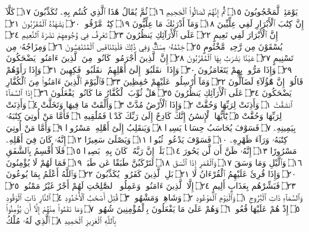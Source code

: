 يَوْمَئِذࣲ لَّمَحْجُوبُونَ ۝١٥ ثُمَّ إِنَّهُمْ لَصَالُوا۟ ٱلْجَحِيمِ ۝١٦ ثُمَّ يُقَالُ هَٰذَا
ٱلَّذِي كُنتُم بِهِۦ تُكَذِّبُونَ ۝١٧ كَلَّآ إِنَّ كِتَٰبَ ٱلْأَبْرَارِ لَفِي عِلِّيِّينَ ۝١٨
وَمَآ أَدْرَىٰكَ مَا عِلِّيُّونَ ۝١٩ كِتَٰبࣱ مَّرْقُومࣱ ۝٢٠ يَشْهَدُهُ ٱلْمُقَرَّبُونَ ۝٢١
إِنَّ ٱلْأَبْرَارَ لَفِي نَعِيمٍ ۝٢٢ عَلَى ٱلْأَرَآئِكِ يَنظُرُونَ ۝٢٣ تَعْرِفُ فِي
وُجُوهِهِمْ نَضْرَةَ ٱلنَّعِيمِ ۝٢٤ يُسْقَوْنَ مِن رَّحِيقࣲ مَّخْتُومٍ ۝٢٥ خِتَٰمُهُۥ
مِسْكࣱۚ وَفِي ذَٰلِكَ فَلْيَتَنَافَسِ ٱلْمُتَنَٰفِسُونَ ۝٢٦ وَمِزَاجُهُۥ مِن
تَسْنِيمٍ ۝٢٧ عَيْنࣰا يَشْرَبُ بِهَا ٱلْمُقَرَّبُونَ ۝٢٨ إِنَّ ٱلَّذِينَ أَجْرَمُوا۟ كَانُوا۟
مِنَ ٱلَّذِينَ ءَامَنُوا۟ يَضْحَكُونَ ۝٢٩ وَإِذَا مَرُّوا۟ بِهِمْ يَتَغَامَزُونَ ۝٣٠
وَإِذَا ٱنقَلَبُوٓا۟ إِلَىٰٓ أَهْلِهِمُ ٱنقَلَبُوا۟ فَكِهِينَ ۝٣١ وَإِذَا رَأَوْهُمْ قَالُوٓا۟
إِنَّ هَٰٓؤُلَآءِ لَضَآلُّونَ ۝٣٢ وَمَآ أُرْسِلُوا۟ عَلَيْهِمْ حَٰفِظِينَ ۝٣٣
فَٱلْيَوْمَ ٱلَّذِينَ ءَامَنُوا۟ مِنَ ٱلْكُفَّارِ يَضْحَكُونَ ۝٣٤ عَلَى
ٱلْأَرَآئِكِ يَنظُرُونَ ۝٣٥ هَلْ ثُوِّبَ ٱلْكُفَّارُ مَا كَانُوا۟ يَفْعَلُونَ ۝٣٦
إِذَا ٱلسَّمَآءُ ٱنشَقَّتْ ۝١ وَأَذِنَتْ لِرَبِّهَا وَحُقَّتْ ۝٢ وَإِذَا ٱلْأَرْضُ مُدَّتْ ۝٣
وَأَلْقَتْ مَا فِيهَا وَتَخَلَّتْ ۝٤ وَأَذِنَتْ لِرَبِّهَا وَحُقَّتْ ۝٥ يَٰٓأَيُّهَا
ٱلْإِنسَٰنُ إِنَّكَ كَادِحٌ إِلَىٰ رَبِّكَ كَدْحࣰا فَمُلَٰقِيهِ ۝٦ فَأَمَّا مَنْ أُوتِيَ
كِتَٰبَهُۥ بِيَمِينِهِۦ ۝٧ فَسَوْفَ يُحَاسَبُ حِسَابࣰا يَسِيرࣰا ۝٨ وَيَنقَلِبُ
إِلَىٰٓ أَهْلِهِۦ مَسْرُورࣰا ۝٩ وَأَمَّا مَنْ أُوتِيَ كِتَٰبَهُۥ وَرَآءَ ظَهْرِهِۦ ۝١٠ فَسَوْفَ
يَدْعُوا۟ ثُبُورࣰا ۝١١ وَيَصْلَىٰ سَعِيرًا ۝١٢ إِنَّهُۥ كَانَ فِيٓ أَهْلِهِۦ مَسْرُورًا ۝١٣
إِنَّهُۥ ظَنَّ أَن لَّن يَحُورَ ۝١٤ بَلَىٰٓۚ إِنَّ رَبَّهُۥ كَانَ بِهِۦ بَصِيرࣰا ۝١٥ فَلَآ أُقْسِمُ
بِٱلشَّفَقِ ۝١٦ وَٱلَّيْلِ وَمَا وَسَقَ ۝١٧ وَٱلْقَمَرِ إِذَا ٱتَّسَقَ ۝١٨
لَتَرْكَبُنَّ طَبَقًا عَن طَبَقࣲ ۝١٩ فَمَا لَهُمْ لَا يُؤْمِنُونَ ۝٢٠ وَإِذَا قُرِئَ
عَلَيْهِمُ ٱلْقُرْءَانُ لَا  ۝٢١ بَلِ ٱلَّذِينَ كَفَرُوا۟ يُكَذِّبُونَ ۝٢٢
وَٱللَّهُ أَعْلَمُ بِمَا يُوعُونَ ۝٢٣ فَبَشِّرْهُم بِعَذَابٍ أَلِيمٍ ۝٢٤
إِلَّا ٱلَّذِينَ ءَامَنُوا۟ وَعَمِلُوا۟ ٱلصَّٰلِحَٰتِ لَهُمْ أَجْرٌ غَيْرُ مَمْنُونِۭ ۝٢٥
وَٱلسَّمَآءِ ذَاتِ ٱلْبُرُوجِ ۝١ وَٱلْيَوْمِ ٱلْمَوْعُودِ ۝٢ وَشَاهِدࣲ وَمَشْهُودࣲ ۝٣
قُتِلَ أَصْحَٰبُ ٱلْأُخْدُودِ ۝٤ ٱلنَّارِ ذَاتِ ٱلْوَقُودِ ۝٥ إِذْ هُمْ عَلَيْهَا
قُعُودࣱ ۝٦ وَهُمْ عَلَىٰ مَا يَفْعَلُونَ بِٱلْمُؤْمِنِينَ شُهُودࣱ ۝٧ وَمَا نَقَمُوا۟
مِنْهُمْ إِلَّآ أَن يُؤْمِنُوا۟ بِٱللَّهِ ٱلْعَزِيزِ ٱلْحَمِيدِ ۝٨ ٱلَّذِي لَهُۥ مُلْكُ
